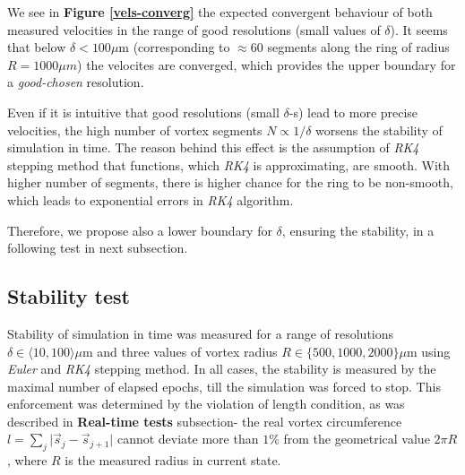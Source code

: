 We see in \textbf{Figure \ref{vels-converg}} the expected convergent behaviour of both measured velocities in the range of good resolutions (small values of $\delta$). It seems that below $ \delta < 100 \mu\text{m}$  (corresponding to $\approx 60$ segments along the ring of radius $R=1000 \mu \unit{m}$) the velocites are converged, which provides the upper boundary for a \textit{good-chosen} resolution.

Even if it is intuitive that good resolutions (small $\delta$-s) lead to more precise velocities, the high number of vortex segments $N \propto 1/\delta$ worsens the stability of simulation in time. The reason behind this effect is the assumption of \textit{RK4} stepping method that functions, which \textit{RK4} is approximating, are smooth. With higher number of segments, there is higher chance for the ring to be non-smooth, which leads to exponential errors in \textit{RK4} algorithm.

Therefore, we propose also a lower boundary for  $\delta$, ensuring the stability, in a following test in next subsection.


\subsection{Stability test}

Stability of simulation in time was measured for a range of resolutions $\delta \in \langle 10, 100 \rangle \mu\text{m}$ and three values of vortex radius $R \in \{500, 1000, 2000\} \mu\text{m}$ using \textit{Euler} and \textit{RK4} stepping method. In all cases, the stability is measured by the maximal number of elapsed epochs, till the simulation was forced to stop.
This enforcement was determined by the violation of length condition, as was described in \textbf{Real-time tests} subsection- the real vortex circumference $l = \sum_j \vert \vec{s}_j - \vec{s}_{j+1} \vert$ cannot deviate more than $1\%$ from the geometrical value $2\pi R$, where $R$ is the measured radius in current state.

